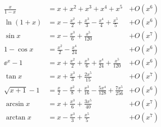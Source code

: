 \begin{equation*}
    \begin{aligned}
        \frac{x}{1-x} &= x + x^2 + x^3 + x^4 + x^5 &+ O(x^6)\\
        \ln(1+x)      &= x - \frac{x^2}{2} + \frac{x^3}{3} - \frac{x^4}{4} + \frac{x^5}{5} &+ O(x^6)\\
        \sin x        &= x - \frac{x^3}{6} + \frac{x^5}{120} &+ O(x^{7})\\
        1- \cos x     &= \frac{x^2}{2} - \frac{x^4}{24} &+ O(x^{6})\\
        \ee^x-1       &= x + \frac{x^2}{2} + \frac{x^3}{6} + \frac{x^4}{24} + \frac{x^5}{120} &+  O(x^{6})\\
        \tan x        &= x + \frac{x^3}{3} + \frac{2x^5}{15} &+ O(x^{7})\\
        \sqrt{x+1}-1  &= \frac{x}{2}-\frac{x^2}{8} +\frac{x^3}{16}-\frac{5 x^4}{128} +\frac{7 x^5}{256} &+  O(x^{6})\\
        \arcsin x     &= x + \frac{x^3}{6} + \frac{3x^5}{40} &+ O(x^7)\\
        \arctan x     &= x - \frac{x^3}{3} + \frac{x^5}{5} &+ O(x^7)
    \end{aligned}
\end{equation*}